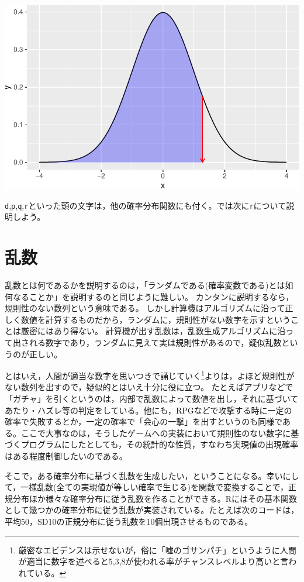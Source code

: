 \documentclass[
  a4paper,
]{ltjsbook}
\begin{document}
\includegraphics{chapter06_files/figure-pdf/p_qNorm2-1.pdf}

\texttt{d},\texttt{p},\texttt{q},\texttt{r}といった頭の文字は，他の確率分布関数にも付く。では次に\texttt{r}について説明しよう。

\section{乱数}\label{ux4e71ux6570}

乱数とは何であるかを説明するのは，「ランダムである(確率変数である)とは如何なることか」を説明するのと同じように難しい。
カンタンに説明するなら，規則性のない数列という意味である。
しかし計算機はアルゴリズムに沿って正しく数値を計算するものだから，ランダムに，規則性がない数字を示すということは厳密にはあり得ない。
計算機が出す乱数は，乱数生成アルゴリズムに沿って出される数字であり，ランダムに見えて実は規則性があるので，疑似乱数というのが正しい。

とはいえ，人間が適当な数字を思いつきで誦じていく\footnote{厳密なエビデンスは示せないが，俗に「嘘のゴサンパチ」というように人間が適当に数字を述べると5,3,8が使われる率がチャンスレベルより高いと言われている。}よりは，よほど規則性がない数列を出すので，疑似的とはいえ十分に役に立つ。
たとえばアプリなどで「ガチャ」を引くというのは，内部で乱数によって数値を出し，それに基づいてあたり・ハズレ等の判定をしている。他にも，RPGなどで攻撃する時に一定の確率で失敗するとか，一定の確率で「会心の一撃」を出すというのも同様である。ここで大事なのは，そうしたゲームへの実装において規則性のない数字に基づくプログラムにしたとしても，その統計的な性質，すなわち実現値の出現確率はある程度制御したいのである。

そこで，ある確率分布に基づく乱数を生成したい，ということになる。幸いにして，一様乱数(全ての実現値が等しい確率で生じる)を関数で変換することで，正規分布ほか様々な確率分布に従う乱数を作ることができる。Rにはその基本関数として幾つかの確率分布に従う乱数が実装されている。たとえば次のコードは，平均50，SD10の正規分布に従う乱数を10個出現させるものである。
\end{document}
